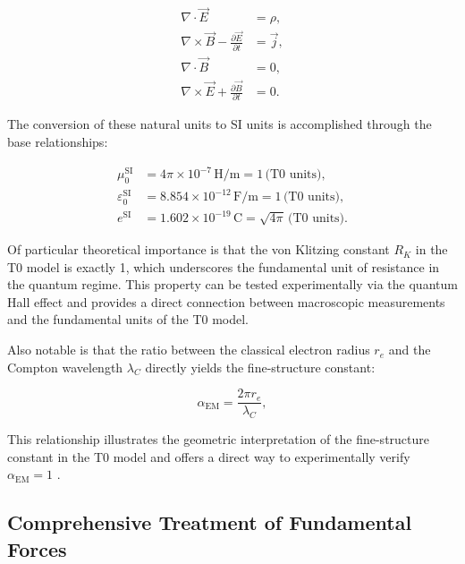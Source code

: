 \documentclass[twocolumn,aps,prl]{revtex4-2}
\begin{document}
	\begin{align}
		\nabla \cdot \vec{E} &= \rho, \label{eq:detailed_gauss} \\
		\nabla \times \vec{B} - \frac{\partial \vec{E}}{\partial t} &= \vec{j}, \label{eq:detailed_ampere} \\
		\nabla \cdot \vec{B} &= 0, \label{eq:detailed_gauss_mag} \\
		\nabla \times \vec{E} + \frac{\partial \vec{B}}{\partial t} &= 0. \label{eq:detailed_faraday}
	\end{align}
	
	The conversion of these natural units to SI units is accomplished through the base relationships:
	
	\begin{align}
		\mu_0^{\text{SI}} &= 4\pi \times 10^{-7} \, \text{H/m} = 1 \, \text{(T0 units)}, \label{eq:mu0_conversion} \\
		\varepsilon_0^{\text{SI}} &= 8.854 \times 10^{-12} \, \text{F/m} = 1 \, \text{(T0 units)}, \label{eq:epsilon0_conversion} \\
		e^{\text{SI}} &= 1.602 \times 10^{-19} \, \text{C} = \sqrt{4\pi} \, \text{(T0 units)}. \label{eq:e_conversion}
	\end{align}
	
	Of particular theoretical importance is that the von Klitzing constant $R_K$ in the T0 model is exactly 1, which underscores the fundamental unit of resistance in the quantum regime. This property can be tested experimentally via the quantum Hall effect \cite{pascher_alpha_2025} and provides a direct connection between macroscopic measurements and the fundamental units of the T0 model.
	
	Also notable is that the ratio between the classical electron radius $r_e$ and the Compton wavelength $\lambda_C$ directly yields the fine-structure constant:
	
	\begin{equation}
		\alpha_{\text{EM}} = \frac{2\pi r_e}{\lambda_C}, \label{eq:detailed_alpha_relation}
	\end{equation}
	
	This relationship illustrates the geometric interpretation of the fine-structure constant in the T0 model and offers a direct way to experimentally verify $\alpha_{\text{EM}} = 1$ \cite{Webb2011}.
	
	\subsection{Comprehensive Treatment of Fundamental Forces}
	\label{subsec:detailed_forces}
	
\end{document}
